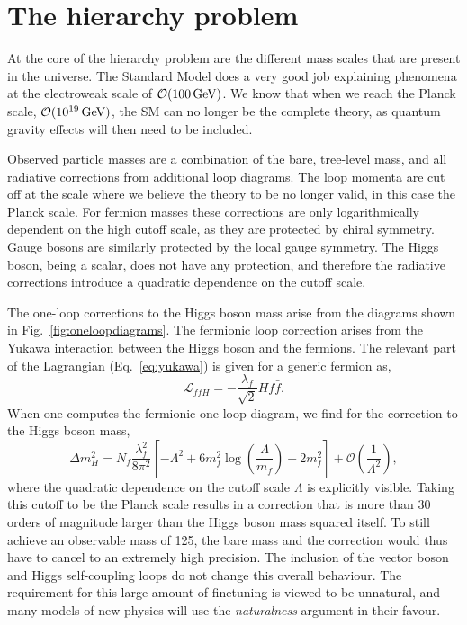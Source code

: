 \section{The hierarchy problem \label{sec:hierarchy_problem}}

At the core of the hierarchy problem are the different mass scales that are present in the
universe. The Standard Model does a very good job explaining phenomena at the electroweak scale of
$\mathcal{O}(100\,\text{Ge\hspace{-.08em}V})$. We know that when we reach the Planck scale,
$\mathcal{O}(\text{10}^{\text{19}}\,\text{Ge\hspace{-.08em}V})$, the SM can no longer be the complete theory, as 
quantum gravity effects will then need to be included. 

Observed particle masses are a combination of the bare, tree-level mass, and all radiative
corrections from additional loop diagrams. The loop momenta are cut off at the scale where we
believe the theory to be no longer valid, in this case the Planck scale. 
For fermion masses these corrections are only logarithmically dependent on the high cutoff scale,
as they are protected by chiral symmetry. Gauge bosons are similarly protected by the local gauge 
symmetry. The Higgs boson, being a scalar, does not have any protection, and therefore the
radiative corrections introduce a quadratic dependence on the cutoff scale. 

The one-loop corrections to the Higgs boson mass arise from the diagrams shown in
Fig.~\ref{fig:oneloopdiagrams}. The fermionic loop correction arises from the Yukawa interaction
between the Higgs boson and the fermions. The relevant part of the Lagrangian (Eq.~\ref{eq:yukawa})
is given for a generic fermion as,
\begin{equation}
  \mathcal{L}_{f\bar{f}H} = - \frac{\lambda_f}{\sqrt{2}} H f \bar{f} .
\end{equation}
When one computes the fermionic one-loop diagram, we find for the correction to the Higgs boson
mass, 
\begin{equation}
  \Delta m_H^2 = N_f \frac{\lambda_f^2}{8\pi^2} \left[ - \Lambda^2 + 6 m_f^2 \log
\left(\frac{\Lambda}{m_f}\right) - 2 m_f^2 \right] + \mathcal{O}\left(\frac{1}{\Lambda^2}\right) ,
\end{equation}
where the quadratic dependence on the cutoff scale $\Lambda$ is explicitly visible. Taking this
cutoff to be the Planck scale results in a correction that is more than 30 orders of magnitude
larger than the Higgs boson mass squared itself. To still achieve an observable mass of 125\GeV, the
bare mass and the correction would thus have to cancel to an extremely high precision. The inclusion
of the vector boson and Higgs self-coupling loops do not change this overall behaviour. 
The requirement for this large amount of finetuning is viewed to be unnatural, and many models of
new physics will use the \textit{naturalness} argument in their favour. 

